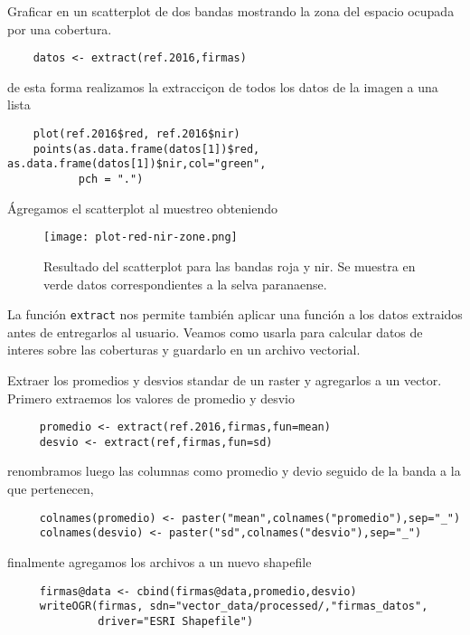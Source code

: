 \begin{exa}
    Graficar en un scatterplot de dos bandas mostrando la zona del espacio
    ocupada por una cobertura.
    \begin{lstlisting}
    datos <- extract(ref.2016,firmas)
    \end{lstlisting}
    de esta forma realizamos la extracciçon de todos los datos de la imagen a una
    lista
    \begin{lstlisting}
    plot(ref.2016$red, ref.2016$nir)
    points(as.data.frame(datos[1])$red, as.data.frame(datos[1])$nir,col="green",
           pch = ".")
    \end{lstlisting}
    Ágregamos el scatterplot al muestreo obteniendo
    \begin{figure}[h!]
    \begin{center}
        \texttt{[image: plot-red-nir-zone.png]}
    \end{center}
    \caption{Resultado del scatterplot para las bandas roja y nir. Se muestra en
        verde datos correspondientes a la selva paranaense.}
    \label{fig:}
    \end{figure}

\end{exa}

La funci\'on \texttt{extract} nos permite tambi\'en aplicar una funci\'on a los datos
extraidos antes de entregarlos al usuario. Veamos como usarla para calcular
datos de interes sobre las coberturas y guardarlo en un archivo vectorial.

\begin{exa}
     Extraer los promedios y desvios standar de un raster y agregarlos a un
     vector. Primero extraemos los valores de promedio y desvio
     \begin{lstlisting}
     promedio <- extract(ref.2016,firmas,fun=mean)
     desvio <- extract(ref,firmas,fun=sd)
     \end{lstlisting}
     renombramos luego las columnas como promedio y devio seguido de la banda a
     la que pertenecen,
     \begin{lstlisting}
     colnames(promedio) <- paster("mean",colnames("promedio"),sep="_")
     colnames(desvio) <- paster("sd",colnames("desvio"),sep="_")
     \end{lstlisting}
     finalmente agregamos los archivos a un nuevo shapefile
     \begin{lstlisting}
     firmas@data <- cbind(firmas@data,promedio,desvio)
     writeOGR(firmas, sdn="vector_data/processed/,"firmas_datos",
              driver="ESRI Shapefile")
     \end{lstlisting}
\end{exa}

